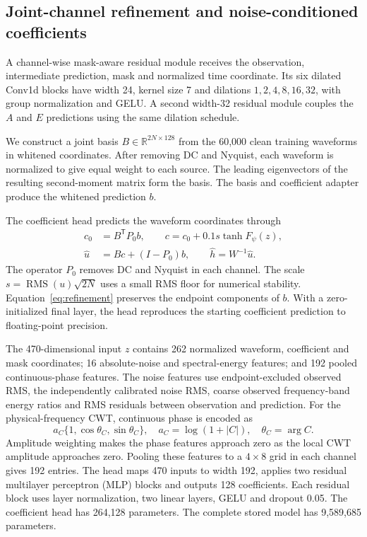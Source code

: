 \documentclass[10pt,prd,aps,a4paper,twocolumn,superscriptaddress,nofootinbib,floatfix]{revtex4-2}
\begin{document}
\subsection{Joint-channel refinement and noise-conditioned coefficients}\label{sec:coefficients}
A channel-wise mask-aware residual module receives the observation, intermediate prediction, mask and normalized time coordinate. Its six dilated Conv1d blocks have width 24, kernel size 7 and dilations $1,2,4,8,16,32$, with group normalization and GELU. A second width-32 residual module couples the $A$ and $E$ predictions using the same dilation schedule.

We construct a joint basis $B\in\mathbb R^{2N\times128}$ from the 60,000 clean training waveforms in whitened coordinates. After removing DC and Nyquist, each waveform is normalized to give equal weight to each source. The leading eigenvectors of the resulting second-moment matrix form the basis. The basis and coefficient adapter produce the whitened prediction $b$.

The coefficient head predicts the waveform coordinates through
\begin{align}
c_0&=B^{\mathsf T}P_0b,\qquad
c=c_0+0.1s\tanh F_\psi(z),\label{eq:refinement}\\
\widehat u&=Bc+(I-P_0)b,\qquad
\widehat h=W^{-1}\widehat u.\nonumber
\end{align}
The operator $P_0$ removes DC and Nyquist in each channel. The scale $s=\operatorname{RMS}(u)\sqrt{2N}$ uses a small RMS floor for numerical stability. Equation~\eqref{eq:refinement} preserves the endpoint components of $b$. With a zero-initialized final layer, the head reproduces the starting coefficient prediction to floating-point precision.

The 470-dimensional input $z$ contains 262 normalized waveform, coefficient and mask coordinates; 16 absolute-noise and spectral-energy features; and 192 pooled continuous-phase features. The noise features use endpoint-excluded observed RMS, the independently calibrated noise RMS, coarse observed frequency-band energy ratios and RMS residuals between observation and prediction. For the physical-frequency CWT, continuous phase is encoded as
\begin{equation}
a_C\{1,\cos\theta_C,\sin\theta_C\},\quad
a_C=\log(1+|C|),\quad\theta_C=\arg C.\label{eq:continuous_phase}
\end{equation}
Amplitude weighting makes the phase features approach zero as the local CWT amplitude approaches zero. Pooling these features to a $4\times8$ grid in each channel gives 192 entries. The head maps 470 inputs to width 192, applies two residual multilayer perceptron (MLP) blocks and outputs 128 coefficients. Each residual block uses layer normalization, two linear layers, GELU and dropout 0.05. The coefficient head has 264,128 parameters. The complete stored model has 9,589,685 parameters.
\end{document}
